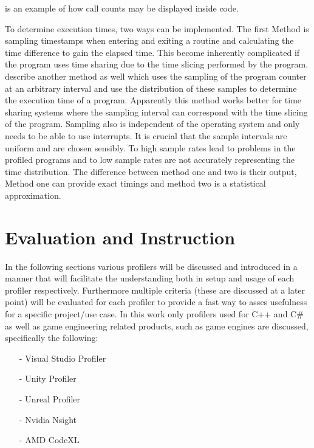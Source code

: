  is an example of how call counts may be displayed inside code.

To determine execution times, two ways can be implemented. The first Method is sampling timestamps when entering and exiting a routine and calculating the time difference to gain the elapsed time. This become inherently complicated if the program uses time sharing due to the time slicing performed by the program. \cite{graham_gprof:_1982} describe another method as well which uses the sampling of the program counter at an arbitrary interval and use the distribution of these samples to determine the execution time of a program. Apparently this method works better for time sharing systems where the sampling interval can correspond with the time slicing of the program. Sampling also is independent of the operating system and only needs to be able to use interrupts. It is crucial that the sample intervals are uniform and are chosen sensibly. To high sample rates lead to problems in the profiled programs and to low sample rates are not accurately representing the time distribution. The difference between method one and two is their output, Method one can provide exact timings and method two is a statistical approximation.\citep{graham_gprof:_1982}

\section{ Evaluation and Instruction}


In the following sections various profilers will be discussed and introduced in a manner that will facilitate the understanding both in setup and usage of each profiler respectively. Furthermore multiple criteria (these are discussed at a later point) will be evaluated for each profiler to provide a fast way to asses usefulness for a specific project/use case. In this work only profilers used for C++ and C\# as well as game engineering related products, such as game engines are discussed, specifically the following:

\begin{enumerate}
    \item[-] Visual Studio Profiler
    \item[-] Unity Profiler
    \item[-] Unreal Profiler
    \item[-] Nvidia Nsight
    \item[-] AMD CodeXL
\end{enumerate}



